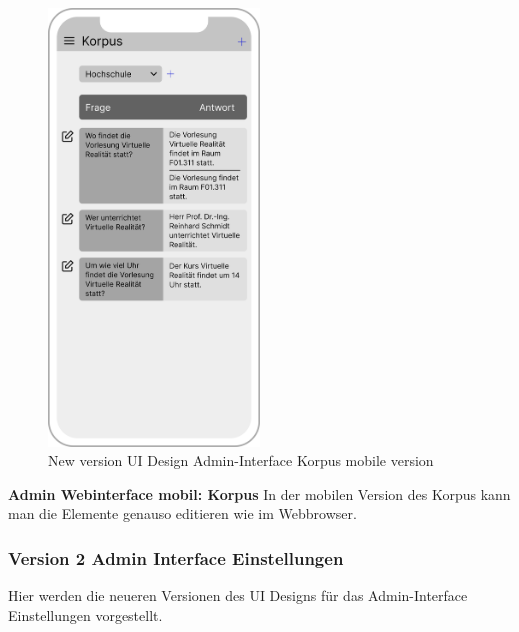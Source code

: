 \begin{figure}[H]
    \centering
    \includegraphics[width=0.5\textwidth]{bilder/new vers. UI Design/Korpus/iPhone X Korpus I.png}
    \caption{New version UI Design Admin-Interface Korpus mobile version}
    \label{fig:New version UI Design Admin-Interface Korpus mobile version}
\end{figure}
\noindent \textbf{Admin Webinterface mobil: Korpus} \newline
In der mobilen Version des Korpus kann man die Elemente genauso editieren wie im Webbrowser.

\newpage
\subsubsection{Version 2 Admin Interface Einstellungen}
Hier werden die neueren Versionen des UI Designs für das Admin-Interface Einstellungen vorgestellt.

